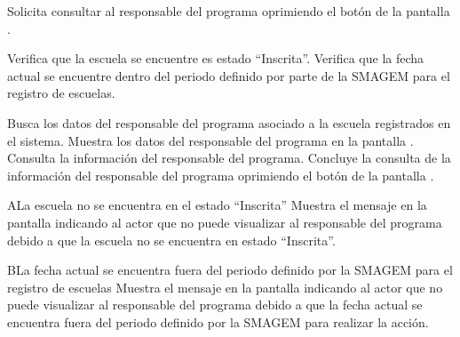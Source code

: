  \begin{UCtrayectoria}
    \UCpaso[\UCactor] Solicita consultar al responsable del programa oprimiendo el botón \botV de la pantalla .
        
    \UCpaso[\UCsist] Verifica que la escuela se encuentre es estado ``Inscrita''. 
    \UCpaso[\UCsist] Verifica que la fecha actual se encuentre dentro del periodo definido por parte de la SMAGEM para el registro de escuelas.     
    
    \UCpaso[\UCsist] Busca los datos del responsable del programa asociado a la escuela registrados en el sistema. 
    \UCpaso[\UCsist] Muestra los datos del responsable del programa en la pantalla .
    \UCpaso[\UCactor] Consulta la información del responsable del programa.
    \UCpaso[\UCactor] Concluye la consulta de la información del responsable del programa oprimiendo el botón  de la pantalla .

 \end{UCtrayectoria}


 \begin{UCtrayectoriaA}{A}{La escuela no se encuentra en el estado ``Inscrita''}
    \UCpaso[\UCsist] Muestra el mensaje  en la pantalla  indicando al actor que no puede visualizar al responsable del programa debido a que la escuela no se encuentra en estado ``Inscrita''.
 \end{UCtrayectoriaA}

 \begin{UCtrayectoriaA}{B}{La fecha actual se encuentra fuera del periodo definido por la SMAGEM para el registro de escuelas}
    \UCpaso[\UCsist] Muestra el mensaje  en la pantalla  indicando al actor que no puede visualizar al responsable del programa debido a que la fecha actual se encuentra fuera del periodo definido por la SMAGEM para realizar la acción.
 \end{UCtrayectoriaA} 

